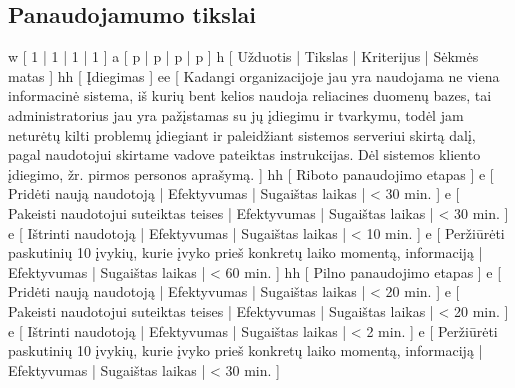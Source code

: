 \subsection{Panaudojamumo tikslai}
\xtable
{
  w [ 1 | 1 | 1 | 1 ]
  a [ p | p | p | p ]
  h [ Užduotis | Tikslas | Kriterijus | Sėkmės matas ]
  hh [ Įdiegimas ]
  ee
  [
    Kadangi organizacijoje jau yra naudojama ne viena informacinė
    sistema, iš kurių bent kelios naudoja reliacines duomenų bazes,
    tai administratorius jau yra pažįstamas su jų įdiegimu ir
    tvarkymu, todėl jam neturėtų kilti problemų įdiegiant ir paleidžiant
    sistemos serveriui skirtą dalį, pagal naudotojui skirtame vadove
    pateiktas instrukcijas. Dėl sistemos kliento įdiegimo, žr.
    pirmos personos aprašymą.
  ]
  hh [ Riboto panaudojimo etapas ]
  e [ Pridėti naują naudotoją | Efektyvumas | Sugaištas laikas | < 30 min. ]
  e [ Pakeisti naudotojui suteiktas teises | Efektyvumas | Sugaištas laikas | < 30 min. ]
  e [ Ištrinti naudotoją | Efektyvumas | Sugaištas laikas | < 10 min. ]
  e [ Peržiūrėti paskutinių 10 įvykių, kurie įvyko prieš konkretų laiko
  momentą, informaciją | Efektyvumas | Sugaištas laikas | < 60 min. ]
  hh [ Pilno panaudojimo etapas ]
  e [ Pridėti naują naudotoją | Efektyvumas | Sugaištas laikas | < 20 min. ]
  e [ Pakeisti naudotojui suteiktas teises | Efektyvumas | Sugaištas laikas | < 20 min. ]
  e [ Ištrinti naudotoją | Efektyvumas | Sugaištas laikas | < 2 min. ]
  e [ Peržiūrėti paskutinių 10 įvykių, kurie įvyko prieš konkretų laiko
  momentą, informaciją | Efektyvumas | Sugaištas laikas | < 30 min. ]
}
